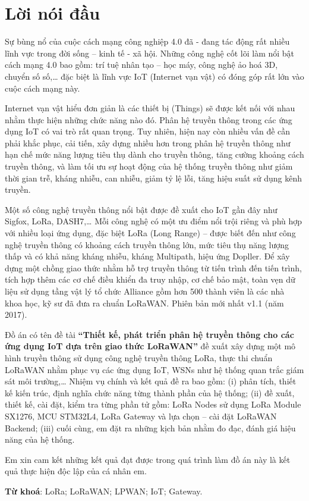 \thispagestyle{plain}

\chapter*{Lời nói đầu}

Sự bùng nổ của cuộc cách mạng công nghiệp 4.0 đã - đang tác động rất nhiều lĩnh vực trong đời sống – kinh tế - xã hội. Những công nghệ cốt lõi làm nổi bật cách mạng 4.0 bao gồm: trí tuệ nhân tạo – học máy, công nghệ ảo hoá 3D, chuyển số số,… đặc biệt là lĩnh vực IoT (Internet vạn vật) có đóng góp rất lớn vào cuộc cách mạng này. \par
	Internet vạn vật hiểu đơn giản là các thiết bị (Things) sẽ được kết nối với nhau nhằm thực hiện những chức năng nào đó. Phân hệ truyền thông trong các ứng dụng IoT có vai trò rất quan trọng. Tuy nhiên, hiện nay còn nhiều vấn đề cần phải khắc phục, cải tiến, xây dựng nhiều hơn trong phân hệ truyền thông như hạn chế mức năng lượng tiêu thụ dành cho truyền thông, tăng cường khoảng cách truyền thông, và làm tối ưu sự hoạt động của hệ thống truyền thông như giảm thời gian trễ, kháng nhiễu, can nhiễu, giảm tỷ lệ lỗi, tăng hiệu suất sử dụng kênh truyền. \par 
	Một số công nghệ truyền thông nổi bật được đề xuất cho IoT gần đây như Sigfox, LoRa, DASH7,… Mỗi công nghệ có một ưu điểm nổi trội riêng và phù hợp với nhiều loại ứng dụng, đặc biệt LoRa (Long Range) – được biết đến như công nghệ truyền thông có khoảng cách truyền thông lớn, mức tiêu thụ năng lượng thấp và có khả năng kháng nhiễu, kháng Multipath, hiệu ứng Dopller. Để xây dựng một chồng giao thức nhằm hỗ trợ truyền thông từ tiến trình đến tiến trình, tích hợp thêm các cơ chế điều khiển đa truy nhập, cơ chế bảo mật, toàn vẹn dữ liệu sử dụng tầng vật lý tổ chức Alliance gồm hơn 500 thành viên là các nhà khoa học, kỹ sư đã đưa ra chuẩn LoRaWAN. Phiên bản mới nhất v1.1 (năm 2017). \par
	Đồ án có tên đề tài \textbf{“Thiết kế, phát triển phân hệ truyền thông cho các ứng dụng IoT dựa trên giao thức LoRaWAN”} đề xuất xây dựng một mô hình truyền thông sử dụng công nghệ truyền thông LoRa, thực thi chuẩn LoRaWAN nhằm phục vụ các ứng dụng IoT, WSNs như hệ thống quan trắc giám sát môi trường,… Nhiệm vụ chính và kết quả đề ra bao gồm: (i) phân tích, thiết kế kiến trúc, định nghĩa chức năng từng thành phần của hệ thống; (ii) đề xuất, thiết kế, cài đặt, kiểm tra từng phần tử gồm: LoRa Nodes sử dụng LoRa Module SX1276, MCU STM32L4, LoRa Gateway và lựa chọn – cài đặt LoRaWAN Backend; (iii) cuối cùng, em đặt ra những kịch bản nhằm đo đạc, đánh giá hiệu năng của hệ thống. \par
	Em xin cam kết những kết quả đạt được trong quá trình làm đồ án này là kết quả thực hiện độc lập của cá nhân em. 

\null\vfill
\begin{flushleft}
\textbf{Từ khoá}: LoRa; LoRaWAN; LPWAN; IoT; Gateway.
\end{flushleft}
      